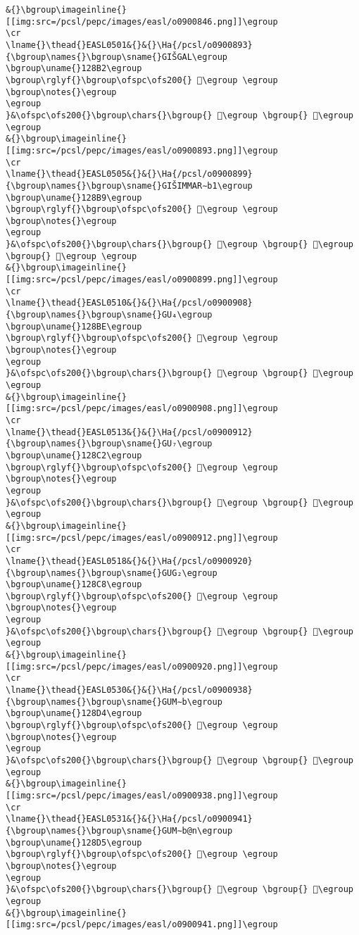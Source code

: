 \begin{verbatim}
&{}\bgroup\imageinline{}[[img:src=/pcsl/pepc/images/easl/o0900846.png]]\egroup
\cr
\lname{}\thead{}EASL0501&{}&{}\Ha{/pcsl/o0900893}{\bgroup\names{}\bgroup\sname{}GIŠGAL\egroup
\bgroup\uname{}128B2\egroup
\bgroup\rglyf{}\bgroup\ofspc\ofs200{} 𒢲\egroup \egroup
\bgroup\notes{}\egroup
\egroup
}&\ofspc\ofs200{}\bgroup\chars{}\bgroup{} 𒢳\egroup \bgroup{} 𒢲\egroup \egroup
&{}\bgroup\imageinline{}[[img:src=/pcsl/pepc/images/easl/o0900893.png]]\egroup
\cr
\lname{}\thead{}EASL0505&{}&{}\Ha{/pcsl/o0900899}{\bgroup\names{}\bgroup\sname{}GIŠIMMAR∼b1\egroup
\bgroup\uname{}128B9\egroup
\bgroup\rglyf{}\bgroup\ofspc\ofs200{} 𒢹\egroup \egroup
\bgroup\notes{}\egroup
\egroup
}&\ofspc\ofs200{}\bgroup\chars{}\bgroup{} 𒢷\egroup \bgroup{} 𒢸\egroup \bgroup{} 𒢹\egroup \egroup
&{}\bgroup\imageinline{}[[img:src=/pcsl/pepc/images/easl/o0900899.png]]\egroup
\cr
\lname{}\thead{}EASL0510&{}&{}\Ha{/pcsl/o0900908}{\bgroup\names{}\bgroup\sname{}GU₄\egroup
\bgroup\uname{}128BE\egroup
\bgroup\rglyf{}\bgroup\ofspc\ofs200{} 𒢾\egroup \egroup
\bgroup\notes{}\egroup
\egroup
}&\ofspc\ofs200{}\bgroup\chars{}\bgroup{} 𒣁\egroup \bgroup{} 𒢾\egroup \egroup
&{}\bgroup\imageinline{}[[img:src=/pcsl/pepc/images/easl/o0900908.png]]\egroup
\cr
\lname{}\thead{}EASL0513&{}&{}\Ha{/pcsl/o0900912}{\bgroup\names{}\bgroup\sname{}GU₇\egroup
\bgroup\uname{}128C2\egroup
\bgroup\rglyf{}\bgroup\ofspc\ofs200{} 𒣂\egroup \egroup
\bgroup\notes{}\egroup
\egroup
}&\ofspc\ofs200{}\bgroup\chars{}\bgroup{} 𒣂\egroup \bgroup{} 𒣃\egroup \egroup
&{}\bgroup\imageinline{}[[img:src=/pcsl/pepc/images/easl/o0900912.png]]\egroup
\cr
\lname{}\thead{}EASL0518&{}&{}\Ha{/pcsl/o0900920}{\bgroup\names{}\bgroup\sname{}GUG₂\egroup
\bgroup\uname{}128C8\egroup
\bgroup\rglyf{}\bgroup\ofspc\ofs200{} 𒣈\egroup \egroup
\bgroup\notes{}\egroup
\egroup
}&\ofspc\ofs200{}\bgroup\chars{}\bgroup{} 𒣊\egroup \bgroup{} 𒣈\egroup \egroup
&{}\bgroup\imageinline{}[[img:src=/pcsl/pepc/images/easl/o0900920.png]]\egroup
\cr
\lname{}\thead{}EASL0530&{}&{}\Ha{/pcsl/o0900938}{\bgroup\names{}\bgroup\sname{}GUM∼b\egroup
\bgroup\uname{}128D4\egroup
\bgroup\rglyf{}\bgroup\ofspc\ofs200{} 𒣔\egroup \egroup
\bgroup\notes{}\egroup
\egroup
}&\ofspc\ofs200{}\bgroup\chars{}\bgroup{} 𒣔\egroup \bgroup{} 𒣗\egroup \egroup
&{}\bgroup\imageinline{}[[img:src=/pcsl/pepc/images/easl/o0900938.png]]\egroup
\cr
\lname{}\thead{}EASL0531&{}&{}\Ha{/pcsl/o0900941}{\bgroup\names{}\bgroup\sname{}GUM∼b@n\egroup
\bgroup\uname{}128D5\egroup
\bgroup\rglyf{}\bgroup\ofspc\ofs200{} 𒣕\egroup \egroup
\bgroup\notes{}\egroup
\egroup
}&\ofspc\ofs200{}\bgroup\chars{}\bgroup{} 𒣕\egroup \bgroup{} 𒣖\egroup \egroup
&{}\bgroup\imageinline{}[[img:src=/pcsl/pepc/images/easl/o0900941.png]]\egroup

\end{verbatim}
